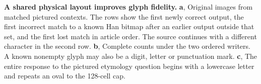 \textbf{A shared physical layout improves glyph fidelity.}
\textbf{a}, Original images from matched pictured contexts. The rows show
the first newly correct output, the first incorrect match to a known Han
bitmap after an earlier output outside that set, and the first lost match
in article order. The source
continues with a different character in the second row.
\textbf{b}, Complete counts under the two ordered writers. A known
nonempty glyph may also be a digit, letter or punctuation mark.
\textbf{c}, The entire response to the pictured etymology question begins
with a lowercase letter and repeats an oval to the 128-cell cap.
